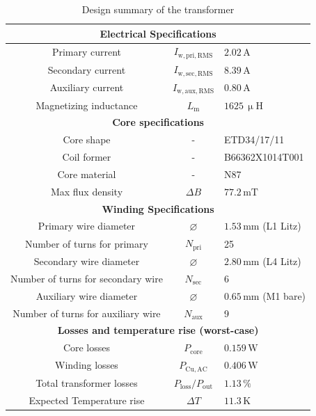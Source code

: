 \documentclass{PELsmallreport}
\begin{document}
\begin{framed}
\begin{table}[H]
\centering
\caption{Design summary of the transformer}
\label{tab:trafo_summary}
\begin{tabular}{|c|c|p{2.5cm}|}
	\multicolumn{3}{c}{\textbf{Electrical Specifications}}\\
	\hline
	Primary current & $I_{\mathrm{w,pri},\mathrm{RMS}}$ & $2.02\,\mathrm{A}$ \\
	\hline
	Secondary current & $I_{\mathrm{w,sec},\mathrm{RMS}}$ & $8.39\,\mathrm{A}$ \\
	\hline
	Auxiliary current & $I_{\mathrm{w,aux},\mathrm{RMS}}$ & $0.80\,\mathrm{A}$ \\
    \hline
    Magnetizing inductance & $L_\mathrm{m}$ & $1625\,\upmu\mathrm{H}$ \\
	\hline
	\multicolumn{3}{c}{\textbf{Core specifications}}\\
	\hline
	Core shape & - & ETD34/17/11 \\
	\hline
	Coil former & - & B66362X1014T001 \\
	\hline
	Core material & - & N87 \\
	\hline
	Max flux density & $\Delta B$ & $77.2\,\mathrm{mT}$ \\
	\hline
	\multicolumn{3}{c}{\textbf{Winding Specifications}}\\
	\hline
	Primary wire diameter & $\varnothing$ & $1.53\,\mathrm{mm}$ (L1 Litz) \\
	\hline
	Number of turns for primary & $N_\mathrm{pri}$ & 25 \\
	\hline
	Secondary wire diameter & $\varnothing$ & $2.80\,\mathrm{mm}$ (L4 Litz) \\
	\hline
	Number of turns for secondary wire & $N_\mathrm{sec}$ & 6 \\
	\hline
	  Auxiliary wire diameter & $\varnothing$ & $0.65\,\mathrm{mm}$ (M1 bare) \\
	\hline
	Number of turns for auxiliary wire & $N_\mathrm{aux}$ & 9 \\
	\hline
	\multicolumn{3}{c}{\textbf{Losses and temperature rise (worst-case)}}\\
	\hline
	Core losses &  $P_\mathrm{core}$ & $0.159\,\mathrm{W}$ \\
	\hline
	Winding losses & $P_\mathrm{Cu,AC}$ & $0.406\,\mathrm{W}$ \\
	\hline
	Total transformer losses & $P_\mathrm{loss}/P_\mathrm{out}$ & $1.13\,\%$ \\
	\hline
	Expected Temperature rise & $\Delta T$ & $11.3\,\mathrm{K}$ \\
	\hline
\end{tabular}
\end{table}
\end{framed}
\end{document}
